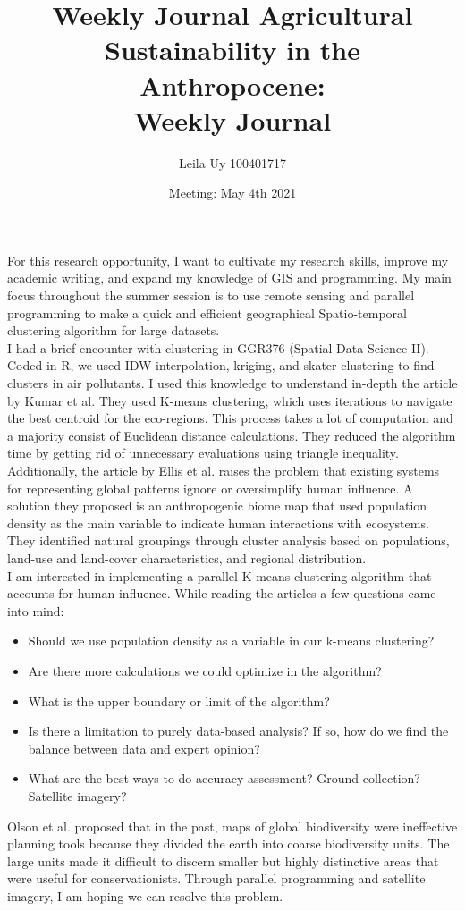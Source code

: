 \documentclass{article}
\title{Weekly Journal}
\title{
    Agricultural Sustainability in the Anthropocene: \\
    Weekly Journal}
\date{Meeting: May 4th 2021}
\author{Leila Uy 100401717}
\begin{document}
\maketitle

\par{
For this research opportunity, I want to cultivate my research skills, improve my academic writing, and expand my knowledge of GIS and programming. My main focus throughout the summer session is to use remote sensing and parallel programming to make a quick and efficient geographical Spatio-temporal clustering algorithm for large datasets.\\

I had a brief encounter with clustering in GGR376 (Spatial Data Science II). Coded in R, we used IDW interpolation, kriging, and skater clustering to find clusters in air pollutants. I used this knowledge to understand in-depth the article by Kumar et al. They used K-means clustering, which uses iterations to navigate the best centroid for the eco-regions. This process takes a lot of computation and a majority consist of Euclidean distance calculations. They reduced the algorithm time by getting rid of unnecessary evaluations using triangle inequality. \\

Additionally, the article by Ellis et al. raises the problem that existing systems for representing global patterns ignore or oversimplify human influence. A solution they proposed is an anthropogenic biome map that used population density as the main variable to indicate human interactions with ecosystems. They identified natural groupings through cluster analysis based on populations, land-use and land-cover characteristics, and regional distribution. \\

I am interested in implementing a parallel K-means clustering algorithm that accounts for human influence. While reading the articles a few questions came into mind:
\begin{itemize}
    \item Should we use population density as a variable in our k-means clustering?
    \item Are there more calculations we could optimize in the algorithm?
    \item What is the upper boundary or limit of the algorithm?
    \item Is there a limitation to purely data-based analysis? If so, how do we find the balance between data and expert opinion?
    \item What are the best ways to do accuracy assessment? Ground collection? Satellite imagery?
\end{itemize}
Olson et al. proposed that in the past, maps of global biodiversity were ineffective planning tools because they divided the earth into coarse biodiversity units. The large units made it difficult to discern smaller but highly distinctive areas that were useful for conservationists. Through parallel programming and satellite imagery, I am hoping we can resolve this problem.
}

%
%
\end{document}
